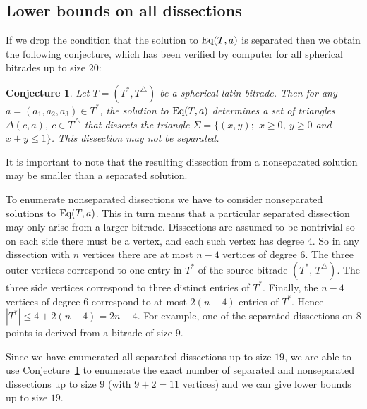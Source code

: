 \documentclass[12pt,amstags,fleqn]{article}
\theoremstyle{plain}
\newtheorem{conjecture}[theorem]{Conjecture}
\theoremstyle{definition}
\theoremstyle{definition}
\def\ll{{\textstyle \ast}}
\def\rr{{\scriptscriptstyle \triangle}}
\newcommand{\opa}{\ll}
\newcommand{\opb}{\rr}
\newcommand{\eq}{\textnormal{Eq}}
\begin{document}
\subsection{Lower bounds on all dissections}

If we drop the condition that the solution to $\eq(T, a)$ is separated
then we obtain the following conjecture, which has been verified by
computer for all spherical bitrades up to size $20$:
 
\begin{conjecture}\label{mainconjecture}
Let $T=(T^\ll, T^\rr)$ be a spherical latin bitrade. Then for 
any $a=(a_1,a_2,a_3) \in T^\ll$,
the solution to $\eq(T,a)$ determines a set of 
triangles $\Delta(c,a)$, $c \in T^\rr$ that dissects the triangle
$\Sigma = \{(x,y);$ $x\ge 0$, $y\ge 0$ and $x+y \le 1\}$. This
dissection may not be separated.
\end{conjecture}

It is important to note that the resulting dissection from a
nonseparated solution may be smaller than a separated solution.



To enumerate nonseparated dissections we have to consider nonseparated
solutions to $\eq(T,a)$. This in turn means that a particular separated
dissection may only arise from a larger bitrade. Dissections are
assumed to be nontrivial so on each side there must be a vertex, and
each such vertex has degree $4$. So in any dissection with $n$ vertices
there are at most $n - 4$ vertices of degree $6$. The three outer
vertices correspond to one entry in $T^{\opa}$ of the source bitrade
$(T^{\opa},\, T^{\opb})$. The three side vertices correspond to three
distinct entries of $T^{\opa}$. Finally, the $n-4$ vertices of degree
$6$ correspond to at most $2(n-4)$ entries of $T^{\opa}$. Hence
$\left| T^{\opa} \right| \leq 4 + 2(n-4) = 2n - 4$.
For example, one of the separated dissections on $8$ points is derived
from a bitrade of size $9$.

Since we have enumerated all separated dissections up to size $19$, we
are able to use Conjecture~\ref{mainconjecture} to enumerate the exact
number of separated and nonseparated dissections up to size $9$ (with
$9+2=11$ vertices) and we can give lower bounds up to size $19$.
\end{document}
